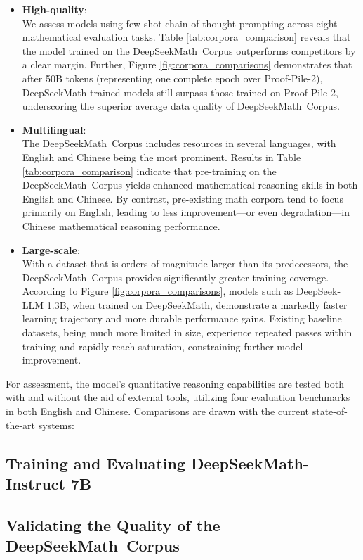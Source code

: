\begin{itemize}[topsep=0pt]
    \item \textbf{High-quality}:\\
    We assess models using few-shot chain-of-thought prompting \cite{cot} across eight mathematical evaluation tasks. Table \ref{tab:corpora_comparison} reveals that the model trained on the DeepSeekMath~Corpus outperforms competitors by a clear margin. Further, Figure \ref{fig:corpora_comparisons} demonstrates that after 50B tokens (representing one complete epoch over Proof-Pile-2), DeepSeekMath-trained models still surpass those trained on Proof-Pile-2, underscoring the superior average data quality of DeepSeekMath~Corpus.
    \item \textbf{Multilingual}:\\
    The DeepSeekMath~Corpus includes resources in several languages, with English and Chinese being the most prominent. Results in Table \ref{tab:corpora_comparison} indicate that pre-training on the DeepSeekMath~Corpus yields enhanced mathematical reasoning skills in both English and Chinese. By contrast, pre-existing math corpora tend to focus primarily on English, leading to less improvement—or even degradation—in Chinese mathematical reasoning performance.
    \item \textbf{Large-scale}:\\
    With a dataset that is orders of magnitude larger than its predecessors, the DeepSeekMath~Corpus provides significantly greater training coverage. According to Figure \ref{fig:corpora_comparisons}, models such as DeepSeek-LLM 1.3B, when trained on DeepSeekMath, demonstrate a markedly faster learning trajectory and more durable performance gains. Existing baseline datasets, being much more limited in size, experience repeated passes within training and rapidly reach saturation, constraining further model improvement.
\end{itemize}

For assessment, the model's quantitative reasoning capabilities are tested both with and without the aid of external tools, utilizing four evaluation benchmarks in both English and Chinese. Comparisons are drawn with the current state-of-the-art systems:

\subsection{Training and Evaluating DeepSeekMath-Instruct 7B}

\subsection{Validating the Quality of the DeepSeekMath~Corpus}


